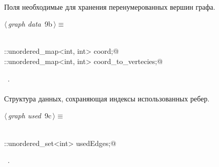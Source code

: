 \documentclass[12pt]{article}
\begin{document}
\paragraph{}
Поля необходимые для хранения перенумерованных вершин графа.

\begin{flushleft} \small
\begin{minipage}{\linewidth}\label{scrap14}\raggedright\small
{} $\langle\,${\itshape graph data}\nobreak\ {\footnotesize {9b}}$\,\rangle\equiv$
\vspace{-1ex}
\begin{list}{}{} \item
\mbox{}\verb@@\\
\mbox{}\verb@std::unordered_map<int, int> coord;@\\
\mbox{}\verb@std::unordered_map<int, int> coord_to_vertecies;@\\
\mbox{}\verb@@{\NWsep}
\end{list}
\vspace{-1.5ex}
\footnotesize
\begin{list}{}{\setlength{\itemsep}{-\parsep}\setlength{\itemindent}{-\leftmargin}}
\item \NWtxtMacroRefIn\ .

\item{}
\end{list}
\end{minipage}\vspace{4ex}
\end{flushleft}
\paragraph{}
Структура данных, сохраняющая индексы использованных ребер. 
\begin{flushleft} \small
\begin{minipage}{\linewidth}\label{scrap15}\raggedright\small
{} $\langle\,${\itshape graph used}\nobreak\ {\footnotesize {9c}}$\,\rangle\equiv$
\vspace{-1ex}
\begin{list}{}{} \item
\mbox{}\verb@@\\
\mbox{}\verb@std::unordered_set<int> usedEdges;@\\
\mbox{}\verb@@{\NWsep}
\end{list}
\vspace{-1.5ex}
\footnotesize
\begin{list}{}{\setlength{\itemsep}{-\parsep}\setlength{\itemindent}{-\leftmargin}}
\item \NWtxtMacroRefIn\ .

\item{}
\end{list}
\end{minipage}\vspace{4ex}
\end{flushleft}
\end{document}
